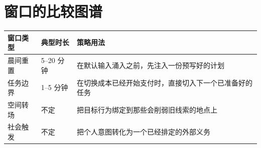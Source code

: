 \section{窗口的比较图谱}

\begin{center}
\begin{tabularx}{\textwidth}{@{}l l X@{}}
\toprule
窗口类型 & 典型时长 & 策略用法 \\
\midrule
晨间重置 & 5--20 分钟 & 在默认输入涌入之前，先注入一份预写好的计划 \\
任务边界 & 1--5 分钟 & 在切换成本已经开始支付时，直接切入下一个已准备好的任务 \\
空间转场 & 不定 & 把目标行为绑定到那些会削弱旧线索的地点上 \\
社会触发 & 不定 & 把个人意图转化为一个已经排定的外部义务 \\
\bottomrule
\end{tabularx}
\end{center}